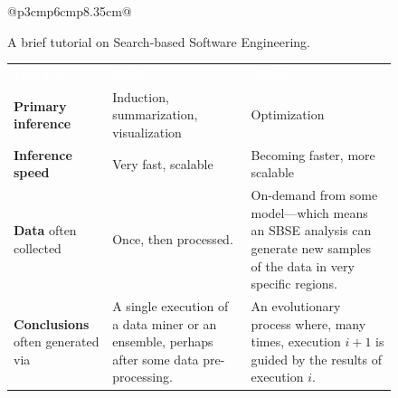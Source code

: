 \documentclass[sigconf,anonymous,review]{acmart}
\begin{document}
\begin{figure}
{\begin{tabular}{@{}p{3cm}p{6cm}p{8.35cm}@{}}
{\begin{minipage}[b]{0.67\linewidth}
                        \end{minipage}	
                }
            \end{tabular}
        }
        \caption{A {brief} tutorial on Search-based Software Engineering.}
        \label{fig:sbse_crash}
\end{figure}

\begin{figure}[t]
    \centering
    \small
    \begin{tabular}{@{}p{3cm}p{6cm}p{8.35cm}@{}}
                
                \rowcolor{gray}\textcolor{white}{\textbf{Features}} & \hspace{2cm}\textcolor{white}{\textbf{MSR}} & \hspace{3cm}\textcolor{white}{\textbf{SBSE}} \\ 
                 \rowcolor{gray!30} \textbf{Primary inference} & Induction, summarization, visualization & Optimization \\
                \textbf{Inference speed} & Very fast, scalable & Becoming faster, more scalable\\
                 \rowcolor{gray!30}\textbf{Data} often collected &
                 Once,  then processed.
                &
                On-demand
                from  some model---which means an SBSE analysis can 
                generate new samples of the data in very  specific regions.
                \\ 
                \textbf{Conclusions} often 
                generated via
                &
                A single  execution of a data miner or an ensemble, 
                perhaps after some data pre-processing. 
                &
                An evolutionary process  where, many times, execution $i+1$ is guided
                by the results of execution $i$.
                \\ 
                 

\end{tabular}
\end{figure}
\end{document}
